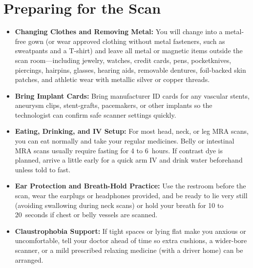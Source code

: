 \section{Preparing for the Scan}
\begin{itemize}
\item \textbf{Changing Clothes and Removing Metal:} You will change into a metal-free gown (or wear approved clothing without metal fasteners, such as sweatpants and a T-shirt) and leave all metal or magnetic items outside the scan room---including jewelry, watches, credit cards, pens, pocketknives, piercings, hairpins, glasses, hearing aids, removable dentures, foil-backed skin patches, and athletic wear with metallic silver or copper threads.
\item \textbf{Bring Implant Cards:} Bring manufacturer ID cards for any vascular stents, aneurysm clips, stent-grafts, pacemakers, or other implants so the technologist can confirm safe scanner settings quickly.
\item \textbf{Eating, Drinking, and IV Setup:} For most head, neck, or leg MRA scans, you can eat normally and take your regular medicines. Belly or intestinal MRA scans usually require fasting for 4 to 6~hours. If contrast dye is planned, arrive a little early for a quick arm IV and drink water beforehand unless told to fast.
\item \textbf{Ear Protection and Breath-Hold Practice:} Use the restroom before the scan, wear the earplugs or headphones provided, and be ready to lie very still (avoiding swallowing during neck scans) or hold your breath for 10 to 20~seconds if chest or belly vessels are scanned.
\item \textbf{Claustrophobia Support:} If tight spaces or lying flat make you anxious or uncomfortable, tell your doctor ahead of time so extra cushions, a wider-bore scanner, or a mild prescribed relaxing medicine (with a driver home) can be arranged.
\end{itemize}

